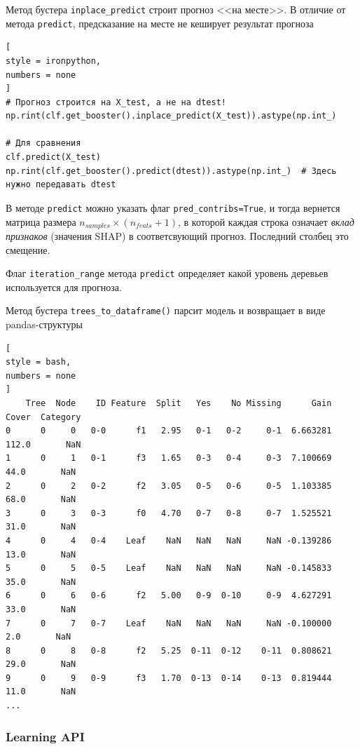 \documentclass[%
	11pt,
	a4paper,
	utf8,
		]{article}
\begin{document}
Метод бустера \verb|inplace_predict| строит прогноз <<на месте>>. В отличие от метода \verb|predict|, предсказание на месте не кеширует результат прогноза
\begin{lstlisting}[
style = ironpython,
numbers = none
]
# Прогноз строится на X_test, а не на dtest!
np.rint(clf.get_booster().inplace_predict(X_test)).astype(np.int_)

# Для сравнения
clf.predict(X_test)
np.rint(clf.get_booster().predict(dtest)).astype(np.int_)  # Здесь нужно передавать dtest
\end{lstlisting}

В методе \verb|predict| можно указать флаг \verb|pred_contribs=True|, и тогда вернется матрица размера $ n_{samples} \times (n_{feats} + 1) $, в которой каждая строка означает \emph{вклад признаков} (значения SHAP) в соответсвующий прогноз. Последний столбец это смещение.

Флаг \verb|iteration_range| метода \verb|predict| определяет какой уровень деревьев используется для прогноза.

Метод бустера \verb|trees_to_dataframe()| парсит модель и возвращает в виде pandas-структуры
\begin{lstlisting}[
style = bash,
numbers = none
]
    Tree  Node    ID Feature  Split   Yes    No Missing      Gain  Cover  Category
0      0     0   0-0      f1   2.95   0-1   0-2     0-1  6.663281  112.0       NaN
1      0     1   0-1      f3   1.65   0-3   0-4     0-3  7.100669   44.0       NaN
2      0     2   0-2      f2   3.05   0-5   0-6     0-5  1.103385   68.0       NaN
3      0     3   0-3      f0   4.70   0-7   0-8     0-7  1.525521   31.0       NaN
4      0     4   0-4    Leaf    NaN   NaN   NaN     NaN -0.139286   13.0       NaN
5      0     5   0-5    Leaf    NaN   NaN   NaN     NaN -0.145833   35.0       NaN
6      0     6   0-6      f2   5.00   0-9  0-10     0-9  4.627291   33.0       NaN
7      0     7   0-7    Leaf    NaN   NaN   NaN     NaN -0.100000    2.0       NaN
8      0     8   0-8      f2   5.25  0-11  0-12    0-11  0.808621   29.0       NaN
9      0     9   0-9      f3   1.70  0-13  0-14    0-13  0.819444   11.0       NaN
...
\end{lstlisting}

\subsubsection{Learning API}
\end{document}
